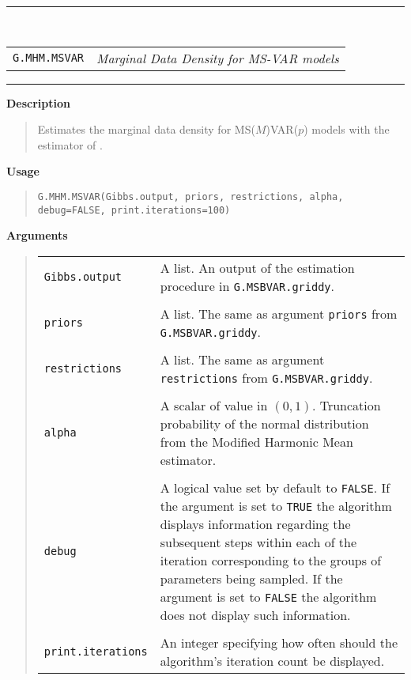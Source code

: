 \documentclass[final,3p,authoryear]{elsarticle}
\begin{document}
\vspace{1.5cm}
\begin{center}
\rule{15cm}{.1pt}\\

\bigskip\begin{tabular}{p{3.5cm} l}
\texttt{G.MHM.MSVAR} & \textit{Marginal Data Density for MS-VAR models} 
\end{tabular}

\smallskip
\rule{15cm}{.1pt}
\end{center}

\bigskip\noindent\textbf{Description}
\begin{quote}
Estimates the marginal data density for MS($M$)VAR($p$) models with the estimator of \cite{Geweke1999,Geweke2005}.
\end{quote}


\bigskip\noindent\textbf{Usage}
\begin{quote}
\begin{verbatim}
G.MHM.MSVAR(Gibbs.output, priors, restrictions, alpha, debug=FALSE, print.iterations=100)
\end{verbatim}
\end{quote}

\bigskip\noindent\textbf{Arguments}
\begin{quote}
\begin{tabular}{p{3cm}p{10cm}}
\texttt{Gibbs.output} & A list. An output of the estimation procedure in \texttt{G.MSBVAR.griddy}.\\
&\\
\texttt{priors} & A list. The same as argument \texttt{priors} from \texttt{G.MSBVAR.griddy}. \\
&\\
\texttt{restrictions} & A list. The same as argument \texttt{restrictions} from \texttt{G.MSBVAR.griddy}. \\
&\\
\texttt{alpha} & A scalar of value in $(0,1)$. Truncation probability of the normal distribution from the Modified Harmonic Mean estimator. \\
&\\
\texttt{debug} & A logical value set by default to \texttt{FALSE}. If the argument is set to \texttt{TRUE} the algorithm displays information regarding the subsequent steps within each of the iteration corresponding to the groups of parameters being sampled. If the argument is set to \texttt{FALSE} the algorithm does not display such information. \\
&\\
\texttt{print.iterations} & An integer specifying how often should the algorithm's iteration count be displayed. 
\end{tabular}
\end{quote}
\end{document}
